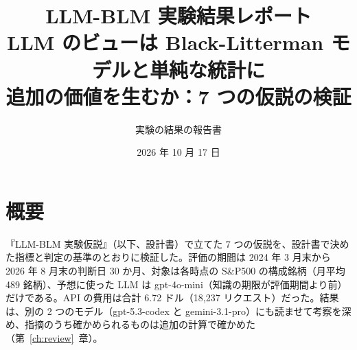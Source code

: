 \documentclass[xelatex,ja=standard,jafont=haranoaji,a4paper,10pt,openany]{bxjsreport}
\title{LLM-BLM 実験結果レポート\\[6pt]
  \large LLM のビューは Black-Litterman モデルと単純な統計に\\追加の価値を生むか：7 つの仮説の検証}
\author{実験の結果の報告書}
\date{2026 年 10 月 17 日}
\newcommand{\SP}{S\&P500}
\newcommand{\chapref}[1]{第~\ref{#1}~章}
\begin{document}
\maketitle

\chapter*{概要}

『LLM-BLM 実験仮説』（以下、設計書）で立てた 7 つの仮説を、設計書で決めた指標と判定の基準のとおりに検証した。評価の期間は 2024 年 3 月末から 2026 年 8 月末の判断日 30 か月、対象は各時点の \SP{} の構成銘柄（月平均 489 銘柄）、予想に使った LLM は gpt-4o-mini（知識の期限が評価期間より前）だけである。API の費用は合計 6.72 ドル（18,237 リクエスト）だった。結果は、別の 2 つのモデル（gpt-5.3-codex と gemini-3.1-pro）にも読ませて考察を深め、指摘のうち確かめられるものは追加の計算で確かめた（\chapref{ch:review}）。
\end{document}
